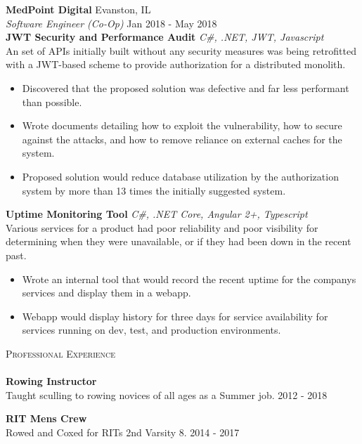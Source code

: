 \documentclass[a4paper]{article}
\newcommand{\lineunder} {
    \vspace*{-8pt} \\
    \hspace*{-18pt} \hrulefill \\
}
\newcommand{\header} [1] {
    {\hspace*{-18pt}\vspace*{6pt} \textsc{#1}}
    \vspace*{-6pt} \lineunder
}
\begin{document}
\textbf{MedPoint Digital} \hfill Evanston, IL\\
\textit{Software Engineer (Co-Op)} \hfill Jan 2018 - May 2018\\
{\textbf{JWT Security and Performance Audit}} {\sl C\#, .NET, JWT, Javascript} \\
An set of APIs initially built without any security measures was being retrofitted with a JWT-based scheme to provide authorization for a distributed monolith.
\begin{itemize} \itemsep 1pt
	\item Discovered that the proposed solution was defective and far less performant than possible.
	\item Wrote documents detailing how to exploit the vulnerability, how to secure against the attacks, and how to remove reliance on external caches for the system.
    \item Proposed solution would reduce database utilization by the authorization system by more than 13 times the initially suggested system.
\end{itemize}
\vspace*{2mm}

{\textbf{Uptime Monitoring Tool}} {\sl C\#, .NET Core, Angular 2+, Typescript} \\
Various services for a product had poor reliability and poor visibility for determining when they were unavailable, or if they had been down in the recent past.
\begin{itemize} \itemsep 1pt
	\item Wrote an internal tool that would record the recent uptime for the company\textquotesingle{}s services and display them in a webapp.\\
    \item Webapp would display history for three days for service availability for services running on dev, test, and production environments.
\end{itemize}
\vspace*{2mm}



\header{Professional Experience}
\textbf{Rowing Instructor}\\
Taught sculling to rowing novices of all ages as a Summer job. \hfill 2012 - 2018\\
\vspace*{2mm}

\textbf{RIT Men\textquotesingle{}s Crew}\\
Rowed and Coxed for RIT\textquotesingle{}s 2nd Varsity 8. \hfill  2014 - 2017\\
\vspace*{2mm}
\end{document}
